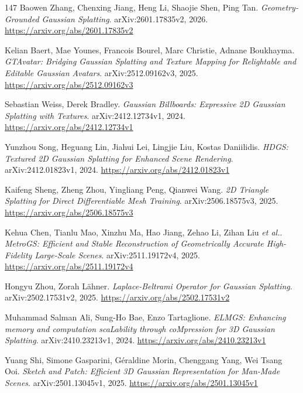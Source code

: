 \documentclass[11pt,a4paper]{article}
\begin{document}
\begin{thebibliography}{147}
Baowen Zhang, Chenxing Jiang, Heng Li, Shaojie Shen, Ping Tan.
\newblock \emph{Geometry-Grounded Gaussian Splatting}.
\newblock arXiv:2601.17835v2, 2026.
\newblock \url{https://arxiv.org/abs/2601.17835v2}

Kelian Baert, Mae Younes, Francois Bourel, Marc Christie, Adnane Boukhayma.
\newblock \emph{GTAvatar: Bridging Gaussian Splatting and Texture Mapping for Relightable and Editable Gaussian Avatars}.
\newblock arXiv:2512.09162v3, 2025.
\newblock \url{https://arxiv.org/abs/2512.09162v3}

Sebastian Weiss, Derek Bradley.
\newblock \emph{Gaussian Billboards: Expressive 2D Gaussian Splatting with Textures}.
\newblock arXiv:2412.12734v1, 2024.
\newblock \url{https://arxiv.org/abs/2412.12734v1}

Yunzhou Song, Heguang Lin, Jiahui Lei, Lingjie Liu, Kostas Daniilidis.
\newblock \emph{HDGS: Textured 2D Gaussian Splatting for Enhanced Scene Rendering}.
\newblock arXiv:2412.01823v1, 2024.
\newblock \url{https://arxiv.org/abs/2412.01823v1}

Kaifeng Sheng, Zheng Zhou, Yingliang Peng, Qianwei Wang.
\newblock \emph{2D Triangle Splatting for Direct Differentiable Mesh Training}.
\newblock arXiv:2506.18575v3, 2025.
\newblock \url{https://arxiv.org/abs/2506.18575v3}

Kehua Chen, Tianlu Mao, Xinzhu Ma, Hao Jiang, Zehao Li, Zihan Liu \emph{et al.}.
\newblock \emph{MetroGS: Efficient and Stable Reconstruction of Geometrically Accurate High-Fidelity Large-Scale Scenes}.
\newblock arXiv:2511.19172v4, 2025.
\newblock \url{https://arxiv.org/abs/2511.19172v4}

Hongyu Zhou, Zorah L\"{a}hner.
\newblock \emph{Laplace-Beltrami Operator for Gaussian Splatting}.
\newblock arXiv:2502.17531v2, 2025.
\newblock \url{https://arxiv.org/abs/2502.17531v2}

Muhammad Salman Ali, Sung-Ho Bae, Enzo Tartaglione.
\newblock \emph{ELMGS: Enhancing memory and computation scaLability through coMpression for 3D Gaussian Splatting}.
\newblock arXiv:2410.23213v1, 2024.
\newblock \url{https://arxiv.org/abs/2410.23213v1}

Yuang Shi, Simone Gasparini, G\'{e}raldine Morin, Chenggang Yang, Wei Tsang Ooi.
\newblock \emph{Sketch and Patch: Efficient 3D Gaussian Representation for Man-Made Scenes}.
\newblock arXiv:2501.13045v1, 2025.
\newblock \url{https://arxiv.org/abs/2501.13045v1}


\end{thebibliography}
\end{document}
